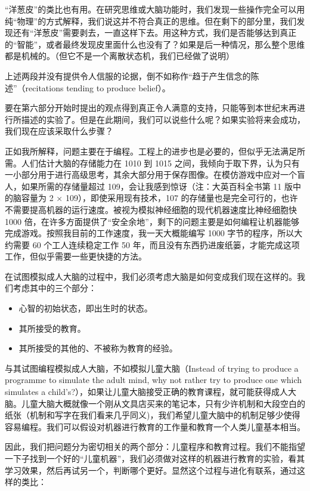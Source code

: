 \documentclass[12pt,a4paper,twoside]{article}
\begin{document}
“洋葱皮”的类比也有用。在研究思维或大脑功能时，我们发现一些操作完全可以用纯“物理”的方式解释，我们说这并不符合真正的思维。但在剩下的部分里，我们发现还有“洋葱皮”需要剥去，一直这样下去。用这种方式，我们是否能够达到真正的“智能”，或者最终发现皮里面什么也没有了？如果是后一种情况，那么整个思维都是机械的。（但它不是一个离散状态机，我们已经做了说明）

上述两段并没有提供令人信服的论据，倒不如称作“趋于产生信念的陈述”（recitations tending to produce belief）。

要在第六部分开始时提出的观点得到真正令人满意的支持，只能等到本世纪末再进行所描述的实验了。但是在此期间，我们可以说些什么呢？如果实验将来会成功，我们现在应该采取什么步骤？

正如我所解释，问题主要在于编程。工程上的进步也是必要的，但似乎无法满足所需。人们估计大脑的存储能力在 1010 到 1015 之间，我倾向于取下界，认为只有一小部分用于进行高级思考，其余大部分用于保存图像。在模仿游戏中应对一个盲人，如果所需的存储量超过 109，会让我感到惊讶（注：大英百科全书第 11 版中的脑容量为 2 × 109），即使采用现有技术，107 的存储量也是完全可行的，也许不需要提高机器的运行速度。被视为模拟神经细胞的现代机器速度比神经细胞快 1000 倍，在许多方面提供了“安全余地”，剩下的问题主要是如何编程让机器能够完成游戏。按照我目前的工作速度，我一天大概能编写 1000 字节的程序，所以大约需要 60 个工人连续稳定工作 50 年，而且没有东西扔进废纸篓，才能完成这项工作，但似乎需要一些更快捷的方法。

在试图模拟成人大脑的过程中，我们必须考虑大脑是如何变成我们现在这样的。我们考虑其中的三个部分：

\begin{itemize}
\item 心智的初始状态，即出生时的状态。
\item 其所接受的教育。
\item 其所接受的其他的、不被称为教育的经验。
\end{itemize}


与其试图编程模拟成人大脑，不如模拟儿童大脑（Instead of trying to produce a programme to simulate the adult mind, why not rather try to produce one which simulates a child’s?），如果让儿童大脑接受正确的教育课程，就可能获得成人大脑。儿童大脑大概就像一个刚从文具店买来的笔记本，只有少许机制和大段空白的纸张（机制和写字在我们看来几乎同义)，我们希望儿童大脑中的机制足够少使得容易编程。我们可以假设对机器进行教育的工作量和教育一个人类儿童基本相当。

因此，我们把问题分为密切相关的两个部分：儿童程序和教育过程。我们不能指望一下子找到一个好的“儿童机器”，我们必须做对这样的机器进行教育的实验，看其学习效果，然后再试另一个，判断哪个更好。显然这个过程与进化有联系，通过这样的类比：
\end{document}
